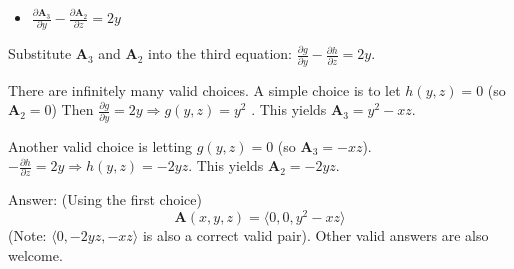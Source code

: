 \documentclass[a4paper, 12pt]{article}
\begin{document}
\begin{enumerate}[leftmargin=*,label=\textbf{\arabic*.}]
\begin{enumerate}[leftmargin=*, label=\textbf{\arabic{enumi}.\arabic*.}]
\begin{itemize}
    \item $\displaystyle\frac{\partial\mathbf A_{3}}{\partial y}-\frac{\partial\mathbf A_{2}}{\partial z}=2y$
\end{itemize}

Substitute $\mathbf A_{3}$ and $\mathbf A_{2}$ into the third equation: $\frac{\partial g}{\partial y}-\frac{\partial h}{\partial z}=2y$.

There are infinitely many valid choices. A simple choice is to let $h(y,z)=0$ (so $\mathbf A_{2}=0$) Then
$\frac{\partial g}{\partial y}=2y\Rightarrow g(y,z)=y^{2}$ . This yields $\mathbf A_{3}=y^{2}-xz$.

Another valid choice is letting $g(y,z)=0$ (so $\mathbf A_{3}=-xz$). $-\frac{\partial h}{\partial z}=2y\Rightarrow h(y,z)=-2yz$.
This yields $\mathbf A_{2}=-2yz.$

Answer: (Using the first choice)
\[\boxed{\mathbf A(x,y,z)=\langle0,0,y^{2}-xz\rangle}\]
(Note: $\langle0,-2yz,-xz\rangle$ is also a correct valid pair).
Other valid answers are also welcome.
\end{enumerate}
\end{enumerate}
\end{document}
